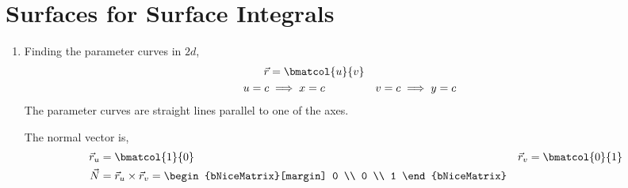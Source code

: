 \section{Surfaces for Surface Integrals}

\begin{enumerate}
    \item Finding the parameter curves in $ 2d $,
          \begin{align}
              \vec{r} & = \bmatcol{u}{v}   \\
              u = c   & \implies x = c   &
              v = c   & \implies y = c
          \end{align}
          The parameter curves are straight lines parallel to one of the axes. \par
          The normal vector is,
          \begin{align}
              \vec{r}_u & = \bmatcol{1}{0}               &
              \vec{r}_v & = \bmatcol{0}{1}                 \\
              \vec{N}   & = \vec{r}_u \times \vec{r}_v =
              \begin{bNiceMatrix}[margin]
                  0 \\ 0 \\ 1
              \end{bNiceMatrix}
          \end{align}


\end{enumerate}
